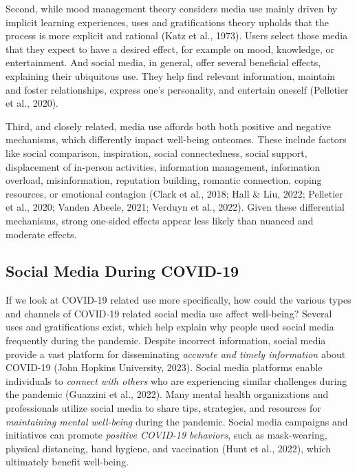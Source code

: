 \documentclass[
  man,mask,floatsintext]{apa7}
\begin{document}
Second, while mood management theory considers media use mainly driven by implicit learning experiences, uses and gratifications theory upholds that the process is more explicit and rational (Katz et al., 1973).
Users select those media that they expect to have a desired effect, for example on mood, knowledge, or entertainment.
And social media, in general, offer several beneficial effects, explaining their ubiquitous use.
They help find relevant information, maintain and foster relationships, express one's personality, and entertain oneself (Pelletier et al., 2020).

Third, and closely related, media use affords both both positive and negative mechanisms, which differently impact well-being outcomes.
These include factors like social comparison, inspiration, social connectedness, social support, displacement of in-person activities, information management, information overload, misinformation, reputation building, romantic connection, coping resources, or emotional contagion (Clark et al., 2018; Hall \& Liu, 2022; Pelletier et al., 2020; Vanden Abeele, 2021; Verduyn et al., 2022).
Given these differential mechanisms, strong one-sided effects appear less likely than nuanced and moderate effects.

\subsection{Social Media During COVID-19}\label{social-media-during-covid-19}

If we look at COVID-19 related use more specifically, how could the various types and channels of COVID-19 related social media use affect well-being?
Several uses and gratifications exist, which help explain why people used social media frequently during the pandemic.
Despite incorrect information, social media provide a vast platform for disseminating \emph{accurate and timely information} about COVID-19 (John Hopkins University, 2023).
Social media platforms enable individuals to \emph{connect with others} who are experiencing similar challenges during the pandemic (Guazzini et al., 2022).
Many mental health organizations and professionals utilize social media to share tips, strategies, and resources for \emph{maintaining mental well-being} during the pandemic.
Social media campaigns and initiatives can promote \emph{positive COVID-19 behaviors}, such as mask-wearing, physical distancing, hand hygiene, and vaccination (Hunt et al., 2022), which ultimately benefit well-being.
\end{document}
